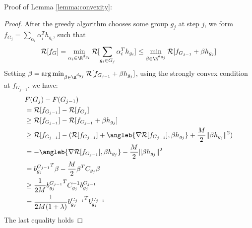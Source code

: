 Proof of Lemma \ref{lemma:convexity}:
\begin{proof}
After the greedy algorithm chooses some group $g_j$ at step $j$, 
  we form $f_{G_j} = \sum _{\alpha _i} \alpha_i^T h_{g_i}$, such that
   \[
    \mathcal{R}[f_G] = \min _{ \alpha _i \in \R^{d_{g_i}}} 
      \mathcal{R}[ \sum _{g_i \in G_j} \alpha_i^T h_{g_i}] \leq
      \min _{\beta \in \R^{d_{g_j}}} 
    \mathcal{R}[f_{G_{j-1}} + \beta h_{g_j}]
   \]
 Setting $\beta = \arg \min _{\beta \in \R^{d_{g_j}}} 
    \mathcal{R}[f_{G_{j-1}} + \beta h_{g_j}]$, using the strongly convex condition at
      $f_{G_{j-1}}$, we have:
 \begin{align*}
    & F(G_j) - F(G_{j-1}) \\
    &=  \mathcal{R}[f_{G_{j-1}}] - \mathcal{R}[f_{G_j}] \\
    &\geq \mathcal{R}[f_{G_{j-1}}] - \mathcal{R}[f_{G_{j-1}} + \beta h_{g_j}] \\ 
    &\geq  \mathcal{R}[f_{G_{j-1}}] - 
      (\mathcal{R}[f_{G_{j-1}}] + 
        \angleb{ \nabla \mathcal{R}[f_{G_{j-1}}] , 
        \beta h_{g_j} }
       + \frac{M}{2} \Vert \beta h_{g_j} \Vert ^2) \\
    &=  -  \angleb{ \nabla \mathcal{R}[f_{G_{j-1}}] , 
        \beta h_{g_j} }
       - \frac{M}{2} \Vert \beta h_{g_j} \Vert ^2 \\
    &=  {b^{{G_{j-1}}}_{g_j}} ^T \beta - \frac{M}{2} \beta^T C_{g_j} \beta \\
    &\geq  \frac{1}{2M} { b^{{G_{j-1}}}_{g_j} } ^T C_{g_j}^{-1} b^{{G_{j-1}}}_{g_j} \\
    &=  \frac{1}{2M (1+\lambda)} {b^{{G_{j-1}}}_{g_j}}^Tb^{{G_{j-1}}}_{g_j}
 \end{align*}
 The last equality holds

\end{proof}
